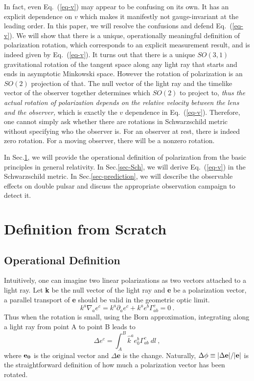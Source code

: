 \documentclass[aps,showpacs,onecolumn,floats,prd,superscriptaddress,nofootinbib]{revtex4}
\begin{document}
In fact, even Eq.~(\ref{eq-v}) may appear to be confusing on its own.
It has an explicit dependence on $v$ which makes it manifestly not gauge-invariant at the leading order. 
In this paper, we will resolve the confusions and defend Eq.~(\ref{eq-v}). 
We will show that there is a unique, operationally meaningful definition of polarization rotation, which corresponds to an explicit measurement result, and is indeed given by Eq.~(\ref{eq-v}).
It turns out that there is a unique $SO(3,1)$ gravitational rotation of the tangent space along any light ray that starts and ends in asymptotic Minkowski space. 
However the rotation of polarization is an $SO(2)$ projection of that. 
The null vector of the light ray and the timelike vector of the observer together determines which $SO(2)$ to project to, {\it thus the actual rotation of polarization depends on the relative velocity between the lens and the observer,} which is exactly the $v$ dependence in Eq.~(\ref{eq-v}).
Therefore, one cannot simply ask whether there are rotations in Schwarzschild metric without specifying who the observer is.
For an observer at rest, there is indeed zero rotation.
For a moving observer, there will be a nonzero rotation.

In Sec.\ref{sec-born}, we will provide the operational definition of polarization from the basic principles in general relativity.
In Sec.\ref{sec-Sch}, we will derive Eq.~(\ref{eq-v}) in the Schwarzschild metric.
In Sec.\ref{sec-prediction}, we will describe the observable effects on double pulsar and discuss the appropriate observation campaign to detect it.

\section{Definition from Scratch}
\label{sec-born}

\subsection{Operational Definition}

Intuitively, one can imagine two linear polarizations as two vectors attached to a light ray. 
Let {\bf k} be the null vector of the light ray and {\bf e} be a polarization vector, a parallel transport of {\bf e} should be valid in the geometric optic limit.
\begin{equation}
k^a \nabla_a e^c = k^a \partial_a e^c + k^a e^b \Gamma_{ab}^c =0~.
\end{equation}
Thus when the rotation is small, using the Born approximation, integrating along a light ray from point A to point B leads to
\begin{equation}
\Delta e^c = \int_A^B \hat{k}^a e_0^b \Gamma_{ab}^c~dl~,
\label{eq-int}
\end{equation}
where ${\bf e_0}$ is the original vector and $\Delta${\bf e} is the change. 
Naturally, $\Delta \phi \equiv |\Delta {\bf e}|/|{\bf e}|$ is the straightforward definition of how much a polarization vector has been rotated.
\end{document}
